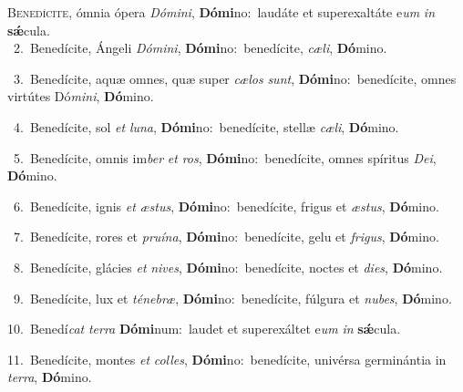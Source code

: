\lettrine{\initial\textcolor{\initialcolor}{B}}{enedícite,} ómnia ópera \textit{Dó}\-\textit{mi}\textit{ni}, \textbf{Dó}\-\textbf{mi}no:~\star laudáte et superexaltáte e\textit{um} \textit{in} \textbf{sǽ}\-cula.\\
{\numbfont\textcolor{\numbcolor}{~2.}}~Benedícite, Ángeli \textit{Dó}\-\textit{mi}\textit{ni}, \textbf{Dó}\-\textbf{mi}no:~\star benedícite, \textit{cæ}\-\textit{li}, \textbf{Dó}\-mino.\par
{\numbfont\textcolor{\numbcolor}{~3.}}~Benedícite, aquæ omnes, quæ super \textit{cæ}\-\textit{los} \textit{sunt}\-, \textbf{Dó}\-\textbf{mi}no:~\star benedícite, omnes virtútes Dó\-\textit{mi}\-\textit{ni}, \textbf{Dó}\-mino.\par
{\numbfont\textcolor{\numbcolor}{~4.}}~Benedícite, sol \textit{et} \textit{lu}\-\textit{na}, \textbf{Dó}\-\textbf{mi}no:~\star benedícite, stellæ \textit{cæ}\-\textit{li}, \textbf{Dó}\-mino.\par
{\numbfont\textcolor{\numbcolor}{~5.}}~Benedícite, omnis im\textit{ber} \textit{et} \textit{ros}\-, \textbf{Dó}\-\textbf{mi}no:~\star benedícite, omnes spíritus \textit{De}\-\textit{i}, \textbf{Dó}\-mino.\par
{\numbfont\textcolor{\numbcolor}{~6.}}~Benedícite, ignis \textit{et} \textit{æs}\-\textit{tus}, \textbf{Dó}\-\textbf{mi}no:~\star benedícite, frigus et \textit{æs}\-\textit{tus}, \textbf{Dó}\-mino.\par
{\numbfont\textcolor{\numbcolor}{~7.}}~Benedícite, rores et \textit{pru}\-\textit{í}\textit{na}, \textbf{Dó}\-\textbf{mi}no:~\star benedícite, gelu et \textit{fri}\-\textit{gus}, \textbf{Dó}\-mino.\par
{\numbfont\textcolor{\numbcolor}{~8.}}~Benedícite, glácies \textit{et} \textit{ni}\-\textit{ves}, \textbf{Dó}\-\textbf{mi}no:~\star benedícite, noctes et \textit{di}\-\textit{es}, \textbf{Dó}\-mino.\par
{\numbfont\textcolor{\numbcolor}{~9.}}~Benedícite, lux et \textit{té}\-\textit{ne}\textit{bræ}, \textbf{Dó}\-\textbf{mi}no:~\star benedícite, fúlgura et \textit{nu}\-\textit{bes}, \textbf{Dó}\-mino.\par
{\numbfont\textcolor{\numbcolor}{10.}}~Benedí\textit{cat} \textit{ter}\-\textit{ra} \textbf{Dó}\-\textbf{mi}num:~\star laudet et superexáltet e\textit{um} \textit{in} \textbf{sǽ}\-cula.\par
{\numbfont\textcolor{\numbcolor}{11.}}~Benedícite, montes \textit{et} \textit{col}\-\textit{les}, \textbf{Dó}\-\textbf{mi}no:~\star benedícite, univérsa germinántia in \textit{ter}\-\textit{ra}, \textbf{Dó}\-mino.\par
